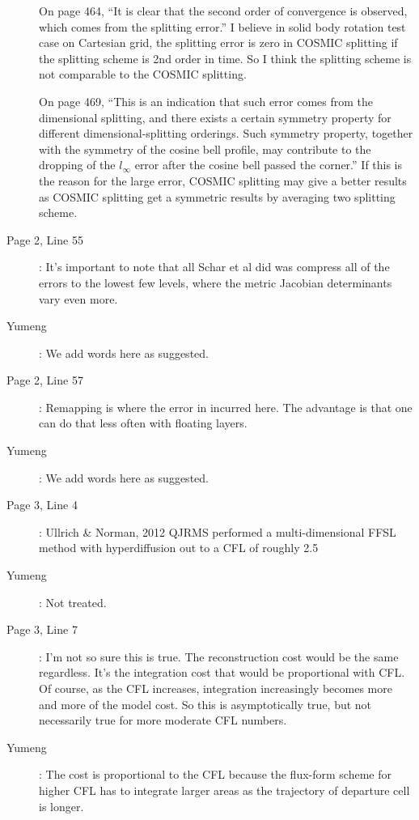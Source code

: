 \documentclass[12pt,a4paper]{article}
\begin{document}
\begin{description}
On page 464, ``It is clear that the second order of convergence is observed, which comes from the splitting error.''
I believe in solid body rotation test case on Cartesian grid, the splitting error is zero in COSMIC splitting if the splitting scheme is 2nd order in time. So I think the splitting scheme is not comparable to the COSMIC splitting.

On page 469, ``This is an indication that such error comes from the dimensional splitting, and there exists a certain symmetry property for different dimensional-splitting orderings. Such symmetry property, together with the symmetry of the cosine bell profile, may contribute to the dropping of the $l_\infty$ error after the cosine bell passed the corner.''
If this is the reason for the large error, COSMIC splitting may give a better results as COSMIC splitting get a symmetric results by averaging two splitting scheme.

\item [Page 2, Line 55]: It's important to note that all Schar et al did was compress all of the errors to the lowest few levels, where the metric Jacobian determinants vary even more.

\item [Yumeng]: We add words here as suggested.

\item [Page 2, Line 57]: Remapping is where the error in incurred here. The advantage is that one can do that less often with floating layers.

\item [Yumeng]: We add words here as suggested.

\item [Page 3, Line 4]: Ullrich \& Norman, 2012 QJRMS performed a multi-dimensional FFSL method with hyperdiffusion out to a CFL of roughly 2.5

\item [Yumeng]: Not treated.

\item [Page 3, Line 7]: I'm not so sure this is true. The reconstruction cost would be the same regardless. It's the integration cost that would be proportional with CFL. Of course, as the CFL increases, integration increasingly becomes more and more of the model cost. So this is asymptotically true, but not necessarily true for more moderate CFL numbers.

\item [Yumeng]: The cost is proportional to the CFL because the flux-form scheme for higher CFL has to integrate larger areas as the trajectory of departure cell is longer.   


\end{description}
\end{document}
